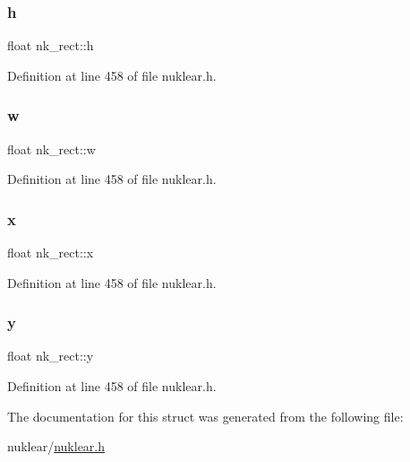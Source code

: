 \subsubsection{\texorpdfstring{h}{h}}
{\footnotesize\ttfamily float nk\+\_\+rect\+::h}



Definition at line 458 of file nuklear.\+h.

\mbox{\label{structnk__rect_af2afe0055fff7694a63a53b8047f6022}} 
\subsubsection{\texorpdfstring{w}{w}}
{\footnotesize\ttfamily float nk\+\_\+rect\+::w}



Definition at line 458 of file nuklear.\+h.

\mbox{\label{structnk__rect_a406b23fbee8afcc3c1a8113c6e4616a1}} 
\subsubsection{\texorpdfstring{x}{x}}
{\footnotesize\ttfamily float nk\+\_\+rect\+::x}



Definition at line 458 of file nuklear.\+h.

\mbox{\label{structnk__rect_ac26ac69f1770909de805053a8cc94f08}} 
\subsubsection{\texorpdfstring{y}{y}}
{\footnotesize\ttfamily float nk\+\_\+rect\+::y}



Definition at line 458 of file nuklear.\+h.



The documentation for this struct was generated from the following file\+:\begin{DoxyCompactItemize}
\item 
nuklear/\mbox{\hyperlink{nuklear_8h}{nuklear.\+h}}\end{DoxyCompactItemize}
